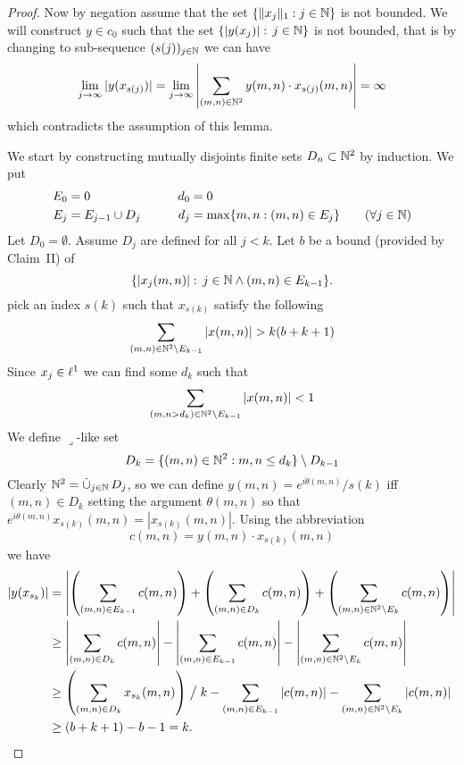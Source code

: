 \begin{enumerate}
\begin{itemize}
\begin{proof}
Now by negation assume that the set  \(\{\|x_j\|_1:j\in\mathbb{N}\}\) is not bounded.
We will construct \(y\in c_0\) such that the set
\(\{|y(x_j)|:\,j\in\mathbb{N}\}\) is not bounded, that is by changing to
sub-sequence \((s(j))_{j\in\mathbb{N}}\) we can have
\begin{equation*}
\lim_{j\to\infty}|y(x_{s(j)})|
 = \lim_{j\to\infty} \left| \sum_{(m,n)\in\mathbb{N}^2} y(m,n)\cdot x_{s(j)}(m,n) \right|
 = \infty
\end{equation*}
which contradicts the assumption of this lemma.

We start by constructing mutually disjoints finite
sets \(D_n \subset \mathbb{N}^2\) by induction.
We put
\begin{alignat*}{2}
E_0 &= 0    &  d_0 &= 0 \\
E_j &= E_{j-1} \cup D_j   \qquad &   d_j &= \max\{m, n: (m,n)\in E_j\}
   \qquad (\forall j\in\mathbb{N})
\end{alignat*}
Let \(D_0 = \emptyset\).
Assume \(D_j\) are defined for all \(j < k\).
Let $b$ be a bound (provided by Claim~II) of
\begin{equation*}
\{|x_j(m,n)|: \, j\in\mathbb{N} \land (m,n) \in E_{k-1}\}.
\end{equation*}
pick an index \(s(k)\) such that \(x_{s(k)}\) satisfy the following
\begin{align*}
\sum_{(m,n) \in \mathbb{N}^2 \setminus E_{k-1}} |x(m,n)| > k(b + k + 1)
\end{align*}
Since \(x_j\in \ell^1\) we can find some \(d_k\) such that
\begin{align*}
\sum_{(m,n > d_k) \in \mathbb{N}^2 \setminus E_{k-1}} |x(m,n)| < 1
\end{align*}
We define \(\lrcorner\)-like set
\begin{equation*}
D_k = \{(m,n)\in \mathbb{N}^2: m,n \leq d_k\} \setminus D_{k-1}
\end{equation*}
Clearly \(\N^2 = \disjunion_{j\in\N} D_j\), so we can define
\(y(m,n) = e^{i\theta(m,n)}/s(k)\) iff \((m,n)\in D_k\)
setting the argument \(\theta(m,n)\)
so that \(e^{i\theta(m,n)} x_{s(k)}(m,n) = |x_{s(k)}(m,n)|\).
Using the abbreviation
\begin{equation*}
c(m,n) =  y(m,n)\cdot x_{s(k)}(m,n)
\end{equation*}
 we have
\begin{align*}
|y(x_{s_k})|
&= \left|
   \left(\sum_{(m,n)\in E_{k-1}} c(m,n)\right)
   + \left(\sum_{(m,n)\in D_k} c(m,n)\right)
   + \left(\sum_{(m,n)\in \mathbb{N}^2 \setminus E_k} c(m,n)\right)
   \right| \\
&\geq
   \left|\sum_{(m,n)\in D_k} c(m,n)\right|
  - \left|\sum_{(m,n)\in E_{k-1}} c(m,n)\right|
  - \left|\sum_{(m,n)\in \mathbb{N}^2 \setminus E_k} c(m,n)\right| \\
&\geq
   \left(\sum_{(m,n)\in D_k} x_{s_k}(m,n)\right)\bigm/ k
  - \sum_{(m,n)\in E_{k-1}} |c(m,n)|
  - \sum_{(m,n)\in \mathbb{N}^2 \setminus E_k} |c(m,n)| \\
&\geq (b+k+1) - b - 1 = k.
\end{align*}
\end{proof}



\end{itemize}
\end{enumerate}
